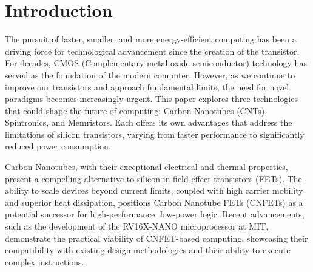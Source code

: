\documentclass[sigconf]{acmart}
\begin{document}

\maketitle

\section{Introduction}
The pursuit of faster, smaller, and more energy-efficient computing
has been a driving force for technological advancement since the 
creation of the transistor. For decades, CMOS (Complementary
metal-oxide-semiconductor) technology has served as the foundation 
of the modern computer. However, as we continue to improve our 
transistors and approach fundamental limits, the need for novel 
paradigms becomes increasingly urgent. This paper explores three 
technologies that could shape the future of computing: Carbon Nanotubes
(CNTs), Spintronics, and Memristors. Each offers its own 
advantages that address the limitations of silicon transistors,
varying from faster performance to significantly reduced power 
consumption. 

Carbon Nanotubes, with their exceptional electrical and thermal 
properties, present a compelling alternative to silicon in 
field-effect transistors (FETs). The ability to scale devices 
beyond current limits, coupled with high carrier mobility and 
superior heat dissipation, positions Carbon Nanotube FETs (CNFETs) 
as a potential successor for high-performance, low-power logic. 
Recent advancements, such as the development of the RV16X-NANO 
microprocessor at MIT, demonstrate the practical viability of 
CNFET-based computing, showcasing their compatibility with 
existing design methodologies and their ability to execute 
complex instructions.
\end{document}
